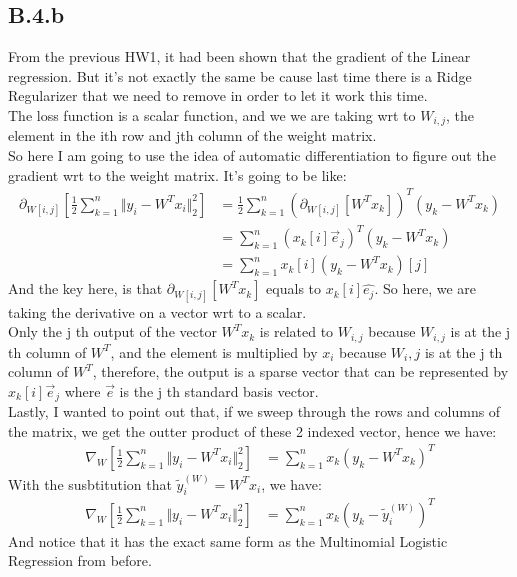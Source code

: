 \documentclass[]{article}
\begin{document}
    \subsection*{B.4.b}
        From the previous HW1, it had been shown that the gradient of the Linear regression. But it's not exactly the same be cause last time there is a Ridge Regularizer that we need to remove in order to let it work this time. 
        \\
        The loss function is a scalar function, and we we are taking wrt to $W_{i, j}$, the element in the ith row and jth column of the weight matrix. 
        \\
        So here I am going to use the idea of automatic differentiation to figure out the gradient wrt to the weight matrix. It's going to be like: 
        \begin{align*}\tag{B.4.b.1}\label{eqn:B.4.b.1}
            \partial_{W[i, j]} \left[
                \frac{1}{2}\sum_{k = 1}^{n}
                    \Vert y_i - W^Tx_i\Vert_2^2
            \right]
            &=
            \frac{1}{2}\sum_{k = 1}^{n}
                    \left(
                        \partial_{W[i, j]}[W^Tx_k]
                    \right)^T
                    (y_k - W^Tx_k)
            \\
            &= 
            \sum_{k = 1}^{n}(x_k[i]\vec{e}_j)^T(y_k - W^Tx_k) 
            \\
            &= 
            \sum_{k = 1}^{n} x_k[i] (y_k - W^T x_k)[j]
        \end{align*}
        And the key here, is that $\partial_{W[i, j]}[W^Tx_k]$ equals to $x_k[i]\hat{e_j}$. So here, we are taking the derivative on a vector wrt to a scalar. 
        \\
        Only the j th output of the vector $W^Tx_k$ is related to $W_{i, j}$ because $W_{i, j}$ is at the j th column of $W^T$, and the element is multiplied by $x_i$ because $W_i, j$ is at the j th column of $W^T$, therefore, the output is a sparse vector that can be represented by $x_k[i]\vec{e}_j$ where $\vec{e}$ is the j th standard basis vector. 
        \\
        Lastly, I wanted to point out that, if we sweep through the rows and columns of the matrix, we get the outter product of these 2 indexed vector, hence we have: 
        \begin{align*}\tag{B.4.b.2}\label{eqn:B.4.b.2}
            \nabla_W \left[
                \frac{1}{2}\sum_{k = 1}^{n}
                    \Vert y_i - W^Tx_i\Vert_2^2
            \right]
            &= 
            \sum_{k = 1}^{n} x_k(y_k - W^T x_k)^T
        \end{align*}
        With the susbtitution that $\tilde{y}_i^{(W)}= W^Tx_i$, we have: 
        \begin{align*}\tag{B.4.b.3}\label{eqn:B.4.b.3}
            \nabla_W \left[
                \frac{1}{2}\sum_{k = 1}^{n}
                    \Vert y_i - W^Tx_i\Vert_2^2
            \right]
            &= 
            \sum_{k = 1}^{n} x_k(y_k - \tilde{y}_i^{(W)})^T
        \end{align*}
        And notice that it has the exact same form as the Multinomial Logistic Regression from before. 
\end{document}
